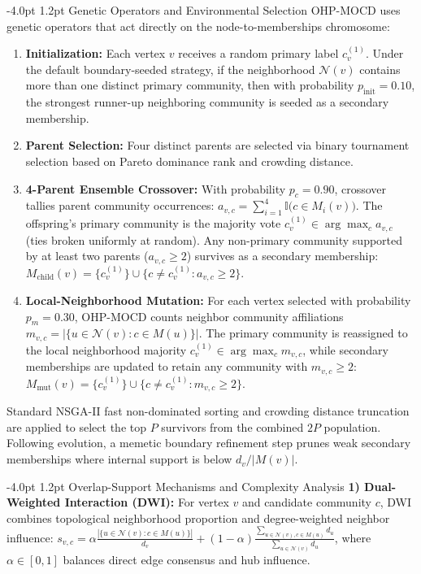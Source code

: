 \documentclass{svproc}
\makeatletter
\renewcommand\subsection{\@startsection{subsection}{2}{\z@}%
  {-4.0pt \@plus -0.5pt \@minus -0.5pt}%
  {1.2pt \@plus 0.5pt}%
  {\normalfont\normalsize\bfseries\boldmath}}
\makeatother
\begin{document}
\subsection{Genetic Operators and Environmental Selection}\label{subsec:operators}
OHP-MOCD uses genetic operators that act directly on the node-to-memberships chromosome:
\begin{enumerate}
    \item \textbf{Initialization:} Each vertex $v$ receives a random primary label $c_v^{(1)}$. Under the default boundary-seeded strategy, if the neighborhood $\mathcal{N}(v)$ contains more than one distinct primary community, then with probability $p_{\mathrm{init}} = 0.10$, the strongest runner-up neighboring community is seeded as a secondary membership.
    \item \textbf{Parent Selection:} Four distinct parents are selected via binary tournament selection based on Pareto dominance rank and crowding distance.
    \item \textbf{4-Parent Ensemble Crossover:} With probability $p_c = 0.90$, crossover tallies parent community occurrences: $a_{v,c} = \sum_{i=1}^{4} \mathbb{I}\big(c \in M_i(v)\big)$. The offspring's primary community is the majority vote $c_v^{(1)} \in \arg\max_c a_{v,c}$ (ties broken uniformly at random). Any non-primary community supported by at least two parents ($a_{v,c} \ge 2$) survives as a secondary membership: $M_{\mathrm{child}}(v) = \{c_v^{(1)}\} \cup \{c \neq c_v^{(1)} : a_{v,c} \ge 2\}$.
    \item \textbf{Local-Neighborhood Mutation:} For each vertex selected with probability $p_m = 0.30$, OHP-MOCD counts neighbor community affiliations $m_{v,c} = |\{u \in \mathcal{N}(v) : c \in M(u)\}|$. The primary community is reassigned to the local neighborhood majority $c_v^{(1)} \in \arg\max_c m_{v,c}$, while secondary memberships are updated to retain any community with $m_{v,c} \ge 2$: $M_{\mathrm{mut}}(v) = \{c_v^{(1)}\} \cup \{c \neq c_v^{(1)} : m_{v,c} \ge 2\}$.
\end{enumerate}
Standard NSGA-II fast non-dominated sorting and crowding distance truncation are applied to select the top $P$ survivors from the combined $2P$ population. Following evolution, a memetic boundary refinement step prunes weak secondary memberships where internal support is below $d_v / |M(v)|$.

\subsection{Overlap-Support Mechanisms and Complexity Analysis}\label{subsec:overlap_and_complexity}
\noindent\textbf{1) Dual-Weighted Interaction (DWI):} For vertex $v$ and candidate community $c$, DWI combines topological neighborhood proportion and degree-weighted neighbor influence: $s_{v,c} = \alpha \frac{|\{u \in \mathcal{N}(v) : c \in M(u)\}|}{d_v} + (1-\alpha) \frac{\sum_{u \in \mathcal{N}(v), c \in M(u)} d_u}{\sum_{u \in \mathcal{N}(v)} d_u}$, where $\alpha \in [0, 1]$ balances direct edge consensus and hub influence.
\end{document}
